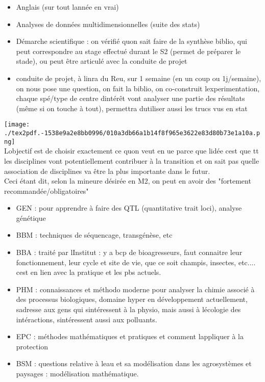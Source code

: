 \documentclass[
]{article}
\providecommand{\tightlist}{%
  \setlength{\itemsep}{0pt}\setlength{\parskip}{0pt}}
\begin{document}
\begin{itemize}
\tightlist
\item
  Anglais (sur tout l\textquotesingle année en vrai)
\item
  Analyses de données multidimensionnelles (suite des stats)
\item
  Démarche scientifique : on vérifié qu\textquotesingle on sait faire de
  la synthèse biblio, qui peut correspondre au stage effectué durant le
  S2 (permet de préparer le stade), ou peut être articulé avec la
  conduite de projet
\item
  conduite de projet, à l\textquotesingle inra du Reu, sur 1 semaine (en
  un coup ou 1j/semaine), on nous pose une question, on fait la biblio,
  on co-construit l\textquotesingle experimentation, chaque spé/type de
  centre d\textquotesingle intérêt vont analyser une partie des
  résultats (même si on touche à tout), permettra
  d\textquotesingle utiliser aussi les trucs vus en stat
\end{itemize}

\texttt{[image: ./tex2pdf.-1538e9a2e8bb0996/010a3db66a1b14f8f965e3622e83d80b73e1a10a.png]}\\
L\textquotesingle objectif est de choisir exactement ce
qu\textquotesingle on veut en ue parce que l\textquotesingle idée
c\textquotesingle est que tt les disciplines vont potentiellement
contribuer à la transition et on sait pas quelle association de
disciplines va être la plus importante dans le futur.\\
Ceci étant dit, selon la mineure désirée en M2, on peut en avoir des
"fortement recommandée/obligatoires"

\begin{itemize}
\tightlist
\item
  GEN : pour apprendre à faire des QTL (quantitative trait loci),
  analyse génétique
\item
  BBM : techniques de séquencage, transgénèse, etc
\item
  BBA : traité par l\textquotesingle Institut : y a bcp de
  bioagresseurs, faut connaitre leur fonctionnement, leur cycle et site
  de vie, que ce soit champis, insectes, etc.... c\textquotesingle est
  en lien avec la pratique et les pbs actuels.
\item
  PHM : connaissances et méthodo moderne pour analyser la chimie associé
  à des processus biologiques, domaine hyper en développement
  actuellement, s\textquotesingle adresse aux gens qui
  s\textquotesingle intéressent à la physio, mais aussi à
  l\textquotesingle écologie des intéractions,
  s\textquotesingle intéressent aussi aux polluants.
\item
  EPC : méthodes mathématiques et pratiques et comment
  l\textquotesingle appliquer à la protection
\item
  BSM : questions relative à l\textquotesingle eau et sa modélisation
  dans les agrosystèmes et paysages : modélisation mathématique.
\end{itemize}
\end{document}
